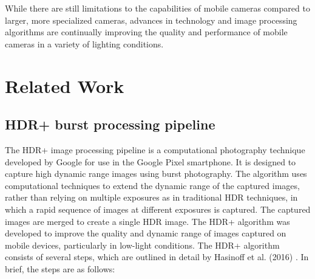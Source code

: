 \documentclass{egpubl}
\begin{document}
While there are still limitations to the capabilities of mobile cameras compared to larger, 
more specialized cameras, advances in technology and image processing algorithms are 
continually improving the quality and performance of mobile cameras in a variety of 
lighting conditions.


\section{Related Work}
\label{sec:related_work}

\subsection{HDR+ burst processing pipeline}
\label{sec:hdrpluspipeline}
The HDR+ image processing pipeline is a computational photography technique developed by Google for use 
in the Google Pixel smartphone. It is designed to capture high dynamic range images using 
burst photography. The algorithm uses computational techniques to extend the dynamic range 
of the captured images, rather than relying on multiple exposures as in traditional 
HDR techniques, in which a rapid sequence of images at different exposures is captured.
The captured images are merged to create a single HDR image. The HDR+ algorithm was developed 
to improve the quality and dynamic range of images captured on mobile devices, particularly in 
low-light conditions. The HDR+ algorithm consists of several steps, which are outlined in detail 
by Hasinoff et al. (2016) \cite{Hasinoff2016burst}. In brief, the steps are as follows:
\end{document}
